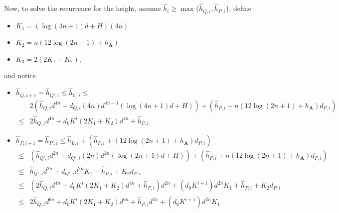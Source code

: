 \documentclass[12pt]{article}
\def\mA{{\bm A}}
\def\mA{{\bm A}}
\begin{document}
\begin{itemize}
Now, to solve the recurrence for the height, assume $\hat{h}_i \geq \max\{\hat{h}_{Q,i},\hat{h}_{P,i}\}$, 
define
\begin{itemize}
    \item $K_1 = (\log(4n+1)d+H)(4n)$
    \item $K_2 = n(12\log(2n+1)+h_{\mA})$
    \item $K_3 = 2(2K_1+K_2)$,
\end{itemize}
%
and notice
\begin{itemize}
    \item $\hat{h}_{Q,i+1} = \hat{h}_{Q',i}\leq \hat{h}_{C,i}\leq$
    \begin{align*}
    &2(\hat{h}_{Q,i}d^{4n} + d_{Q,i} (4n)d^{4n-1}(\log(4n+1)d + H)) + (\hat{h}_{P,i}+n(12\log(2n+1)+h_{\mA})d_{P,i})\\
    \leq& 
    2\hat{h}_{Q,i}d^{4n} + d_0K^i(2K_1+K_2)d^{4n}+\hat{h}_{P,i}
    \end{align*}
    \item $\hat{h}_{P,i+1} = \hat{h}_{P',i}\leq \hat{h}_{L,i}+(\hat{h}_{P,i}+(12\log(2n+1)+h_{\mA})d_{P,i})$
    \begin{align*}
    \leq & \left(\hat{h}_{Q',i}d^{2n} + d_{Q',i} (2n)d^{2n}(\log(2n+1)d + H)\right)
    +(\hat{h}_{P,i}+n(12\log(2n+1)+h_{\mA})d_{P,i})  
    \\
    \leq & \hat{h}_{Q',i}d^{2n} + d_{Q',i} d^{2n}K_1
    +\hat{h}_{P,i}+K_2d_{P,i}
    \\
    \leq & (2\hat{h}_{Q,i}d^{4n} + d_0K^i(2K_1+K_2)d^{4n}+\hat{h}_{P,i})d^{2n} + (d_0K^{i+1}) d^{2n}K_1
    +\hat{h}_{P,i}+K_2d_{P,i}\\
    \leq & 2\hat{h}_{Q,i}d^{6n} + d_0K^i(2K_1+K_2)d^{6n}+\hat{h}_{P,i}d^{2n} + (d_0K^{i+1})d^{2n}K_1

\end{align*}
\end{itemize}
\end{itemize}
\end{document}
